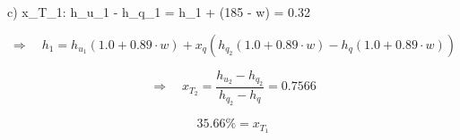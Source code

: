 c) \quad x_{T_1}: \quad h_{u_1} - h_{q_1} = h_{1} + (185 - w) = 0.32  

\[
\Rightarrow \quad h_1 = h_{u_1} (1.0 + 0.89 \cdot w) + x_q \left( h_{q_2} (1.0 + 0.89 \cdot w) - h_q (1.0 + 0.89 \cdot w) \right)
\]

\[
\Rightarrow \quad x_{T_2} = \frac{h_{u_2} - h_{q_2}}{h_{q_2} - h_q} = 0.7566
\]

\[
\boxed{35.66\% = x_{T_1}}
\]